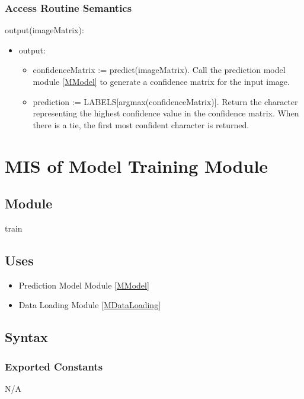 \documentclass[12pt, titlepage]{article}
\begin{document}
\subsubsection{Access Routine Semantics}

\noindent output(imageMatrix):
\begin{itemize}
\item output:
\begin{itemize}
  \item confidenceMatrix := predict(imageMatrix). Call the prediction model
  module \ref{MModel} to generate a confidence matrix for the input image.
  \item prediction := LABELS[argmax(confidenceMatrix)]. Return the character
  representing the highest confidence value in the confidence matrix. When there
  is a tie, the first most confident character is returned.
\end{itemize}
\end{itemize}

\newpage
\section{MIS of Model Training Module} \label{MTraining}

\subsection{Module}

train

\subsection{Uses}

\begin{itemize}
  \item Prediction Model Module \ref{MModel}
  \item Data Loading Module \ref{MDataLoading}
\end{itemize}

\subsection{Syntax}

\subsubsection{Exported Constants}

N/A
\end{document}
